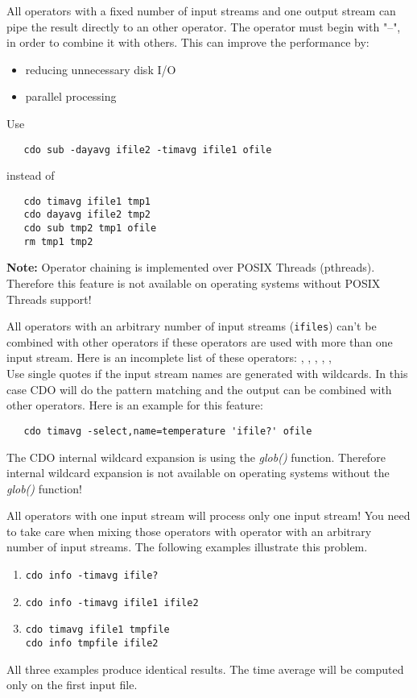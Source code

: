 All operators with a fixed number of input streams and one output stream
can pipe the result directly to an other operator.
The operator must begin with "--", in order to combine it with others.
This can improve the performance by:
\begin{itemize}
\item reducing unnecessary disk I/O
\item parallel processing
\end{itemize}
Use
\begin{verbatim}
   cdo sub -dayavg ifile2 -timavg ifile1 ofile
\end{verbatim}
instead of
\begin{verbatim}
   cdo timavg ifile1 tmp1
   cdo dayavg ifile2 tmp2
   cdo sub tmp2 tmp1 ofile
   rm tmp1 tmp2
\end{verbatim}

\textbf{Note:}
Operator chaining is implemented over POSIX Threads (pthreads).
Therefore this {\CDO} feature is not available on operating systems without POSIX Threads support!

All operators with an arbitrary number of input streams (\texttt{ifiles})
can't be combined with other operators if these operators are used
with more than one input stream. Here is an incomplete list of
these operators:
\textbf{},
\textbf{},
\textbf{},
\textbf{},
\textbf{},
\textbf{} \\
Use single quotes if the input stream names are generated with
wildcards. In this case CDO will do the pattern matching and the
output can be combined with other operators. Here is an example for
this feature:
\begin{verbatim}
   cdo timavg -select,name=temperature 'ifile?' ofile
\end{verbatim}

The CDO internal wildcard expansion is using the \textit{glob()} function. 
Therefore internal wildcard expansion is not available on operating systems without the \textit{glob()} function!

All operators with one input stream will process only one input
stream! You need to take care when mixing those operators with
operator with an arbitrary number of input streams. 
The following examples illustrate this problem.
\begin{enumerate}
\item \texttt{cdo info -timavg ifile?}
\item \texttt{cdo info -timavg ifile1 ifile2}
\item \texttt{cdo timavg ifile1 tmpfile} \\
\texttt{cdo info tmpfile ifile2}
\end{enumerate}
 All three examples produce identical results. 
The time average will be computed only on the first input file. 
